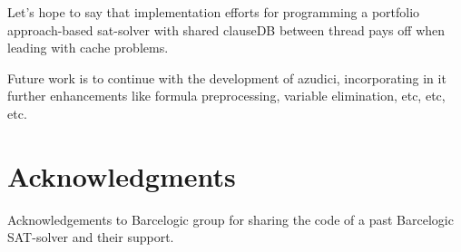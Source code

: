 \documentclass{llncs}
\begin{document}
Let's hope to say that implementation efforts for programming a
portfolio approach-based sat-solver with shared clauseDB between
thread pays off when leading with cache problems.

Future work is to continue with the development of  azudici,
incorporating in it further enhancements like formula preprocessing,
variable elimination, etc, etc, etc.

\section*{Acknowledgments}

Acknowledgements to Barcelogic group for sharing the code of a past
Barcelogic SAT-solver and their support.




\end{document}

